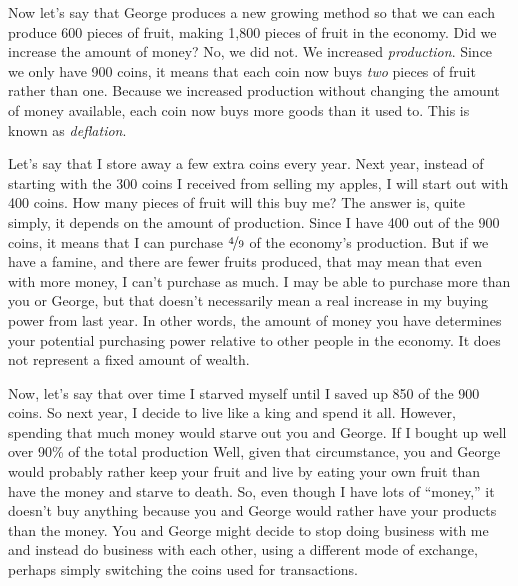 Now let’s say that George produces a new growing method so that we can
each produce 600 pieces of fruit,
making 1,800 pieces
of fruit in the economy. Did we increase the amount of money?  No, we
did not. We increased \textit{production}. Since we only have 900
coins, it means that each coin now buys \textit{two} pieces of fruit
rather than one.  Because we increased production without changing
the amount of money available, each coin now buys more goods than it
used to.  This is known as \textit{deflation}.

Let’s say that I store away a few extra coins every year. Next year,
instead of starting with the 300 coins I received from selling my
apples, I will start out with 400 coins. How many pieces of fruit will
this buy me? The answer is, quite simply, it depends on the amount of
production. Since I have 400 out of the 900 coins, it means that I can
purchase $\nicefrac{4}{9}$ of the economy’s production. But if we have a famine, and
there are fewer fruits produced, that may mean that even with more
money, I can’t purchase as much. I may be able to purchase more than
you or George, but that doesn’t necessarily mean a real increase in my
buying power from last year.  In other words, the amount of money you
have determines your potential purchasing power relative to other people
in the economy.  It does not represent a fixed amount of wealth.

Now, let’s say that over time I starved myself until I saved up 850 of
the 900 coins. So next year, I decide to live like a king and spend it
all.  However, spending that much money would starve out you and George. If
I bought up well over 90\% of the total production Well,
given that circumstance, you and George would probably rather keep your fruit 
and live by eating your own fruit than have the money and starve to death. 
So, even though I have lots of “money,” it doesn’t buy
anything because you and George would rather have your products than
the money. You and George might decide to stop doing business with me
and instead do business with each other, using a different mode of
exchange, perhaps simply switching the coins used for transactions.

